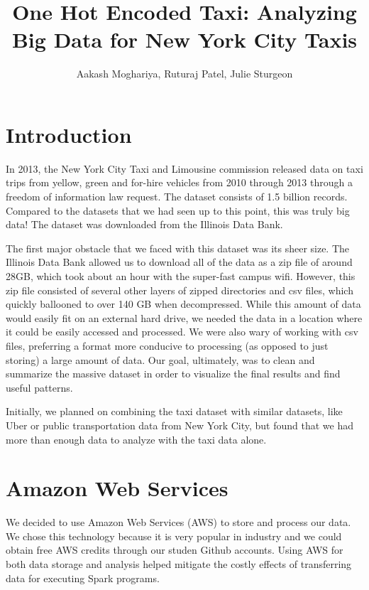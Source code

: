 \documentclass[11pt]{article} %
\title{One Hot Encoded Taxi: Analyzing Big Data for New York City Taxis}
\author{Aakash Moghariya, Ruturaj Patel, Julie Sturgeon}
\begin{document}
\maketitle

\section{Introduction}

In 2013, the New York City Taxi and Limousine commission released data on taxi trips from yellow, green and for-hire vehicles from 2010 through 2013 through a freedom of information law request. The dataset consists of 1.5 billion records. Compared to the datasets that we had seen up to this point, this was truly big data! The dataset was downloaded from the Illinois Data Bank\cite{dataset}.

The first major obstacle that we faced with this dataset was its sheer size. The Illinois Data Bank allowed us to download all of the data as a zip file of around 28GB, which took about an hour with the super-fast campus wifi. However, this zip file consisted of several other layers of zipped directories and csv files, which quickly ballooned to over 140 GB when decompressed. While this amount of data would easily fit on an external hard drive, we needed the data in a location where it could be easily accessed and processed. We were also wary of working with csv files, preferring a format more conducive to processing (as opposed to just storing) a large amount of data. Our goal, ultimately, was to clean and summarize the massive dataset in order to visualize the final results and find useful patterns.

Initially, we planned on combining the taxi dataset with similar datasets, like Uber or public transportation data from New York City, but found that we had more than enough data to analyze with the taxi data alone. 

\section{Amazon Web Services}

We decided to use Amazon Web Services (AWS)\cite{aws} to store and process our data. We chose this technology because it is very popular in industry and we could obtain free AWS credits through our studen Github accounts. Using AWS for both data storage and analysis helped mitigate the costly effects of transferring data for executing Spark programs. 
\end{document}
